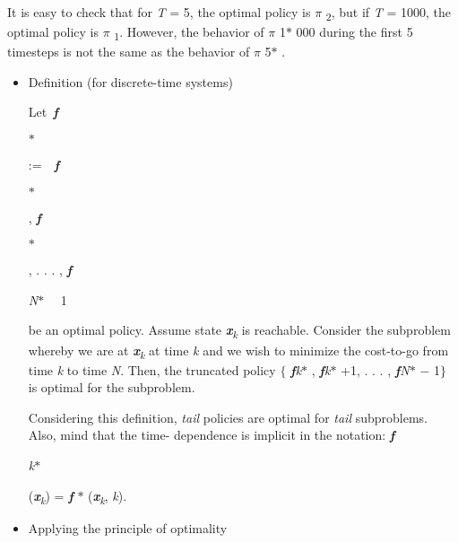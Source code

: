 \documentclass[12pt,twoside]{article}
\begin{document}
\begin{adjustwidth}{0.58in}{0.54in}
It is easy to check that for \textit{T }= 5, the optimal policy is \textit{$ \pi $ }\textsubscript{2}, but if \textit{T }= 1000, the optimal policy is \textit{$ \pi $ }\textsubscript{1}. However, the behavior of \textit{$ \pi $ }1$\ast$ 000  during the first 5 timesteps is not the same as the behavior of \textit{$ \pi $ }5$\ast$ .\par

\end{adjustwidth}


\vspace{\baselineskip}
\begin{itemize}
	\item Definition (for discrete-time systems)\par


\vspace{\baselineskip}
Let\  \textbf{\textit{f }}{\fontsize{7pt}{8.4pt}\selectfont $\ast$  \par}:=\ \  \textbf{\textit{f}}{\fontsize{7pt}{8.4pt}$\ast$ \par}, \textbf{\textit{f}}{\fontsize{7pt}{8.4pt}$\ast$ \par}, . . . , \textbf{\textit{f}}{\fontsize{7pt}{8.4pt}\selectfont \textit{N}$\ast$ \ \  1\ \ \ \  \par}be an optimal policy. Assume state \textbf{\textit{x}}\textit{\textsubscript{k} }is reachable. Consider the subproblem whereby we are at \textbf{\textit{x}}\textit{\textsubscript{k} }at time \textit{k }and we wish to minimize the cost-to-go from time \textit{k }to time \textit{N}. Then, the truncated policy $ \{ $  \textbf{\textit{f}}\textit{k}$\ast$ , \textbf{\textit{f}}\textit{k}$\ast$ +1, . . . , \textbf{\textit{f}}\textit{N}$\ast$  $-$ 1$ \} $  is optimal for the subproblem.\par

Considering this definition, \textit{tail }policies are optimal for \textit{tail }subproblems. Also, mind that the time- dependence is implicit in the notation: \textbf{\textit{f}}{\fontsize{7pt}{8.4pt}\selectfont \textit{k}$\ast$  \par}(\textbf{\textit{x}}\textit{\textsubscript{k}}) = \textbf{\textit{f }}$\ast$  (\textbf{\textit{x}}\textit{\textsubscript{k}}, \textit{k}).\par


\vspace{\baselineskip}
	\item Applying the principle of optimality\par



\end{itemize}
\end{document}
